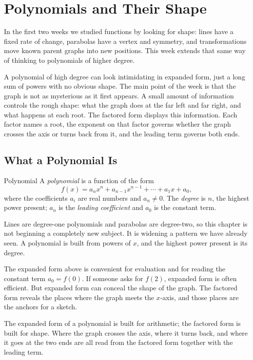 \documentclass[12pt]{book}
\begin{document}
\chapter{Polynomials and Their Shape}

In the first two weeks we studied functions by looking for shape: lines have a fixed
rate of change, parabolas have a vertex and symmetry, and transformations move known
parent graphs into new positions. This week extends that same way of thinking to
polynomials of higher degree.

A polynomial of high degree can look intimidating in expanded form, just a long sum
of powers with no obvious shape. The main point of the week is that the graph is not
as mysterious as it first appears. A small amount of information controls the rough
shape: what the graph does at the far left and far right, and what happens at each
root. The factored form displays this information. Each factor names a root, the
exponent on that factor governs whether the graph crosses the axis or turns back
from it, and the leading term governs both ends.

\section{What a Polynomial Is}

\begin{definition}{Polynomial}
A \emph{polynomial} is a function of the form
\[
f(x)=a_n x^n+a_{n-1}x^{n-1}+\cdots+a_1 x+a_0,
\]
where the coefficients $a_i$ are real numbers and $a_n\neq 0$. The \emph{degree} is
$n$, the highest power present; $a_n$ is the \emph{leading coefficient} and $a_0$ is
the constant term.
\end{definition}

Lines are degree-one polynomials and parabolas are degree-two, so this chapter is
not beginning a completely new subject. It is widening a pattern we have already
seen. A polynomial is built from powers of $x$, and the highest power present is its
degree.

The expanded form above is convenient for evaluation and for reading the constant
term $a_0=f(0)$. If someone asks for $f(2)$, expanded form is often efficient. But
expanded form can conceal the shape of the graph. The factored form reveals the
places where the graph meets the $x$-axis, and those places are the anchors for a
sketch.

\begin{keyidea}
The expanded form of a polynomial is built for arithmetic; the factored form is
built for shape. Where the graph crosses the axis, where it turns back, and where it
goes at the two ends are all read from the factored form together with the leading
term.
\end{keyidea}
\end{document}
